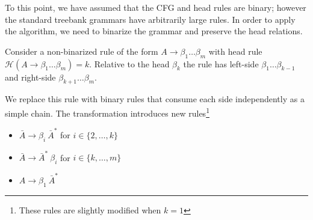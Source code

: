 \documentclass[11pt,letterpaper]{article}
\newcommand{\rules}{\mathcal{R}}
\newcommand{\Rule}[3]{#1 \rightarrow #2\ #3}
\newcommand{\RuleA}[3]{#1 \rightarrow #2^*\ #3}
\newcommand{\lpkcomment}[1]{\textcolor{red}{\bf \small [#1 --lpk]}}
\begin{document}
To this point, we have assumed that the CFG and head rules are binary;
however the standard treebank grammars have arbitrarily large rules.
In order to apply the algorithm, we need to binarize the grammar and
 preserve the head relations.  

 Consider a non-binarized rule of the form $ A \rightarrow \beta_1
 \ldots \beta_m$ with head rule $\mathcal{H}(A \rightarrow \beta_1
 \ldots \beta_m) = k$. Relative to the head $\beta_k$ the rule has
 left-side $\beta_1 \ldots \beta_{k-1}$ and right-side $\beta_{k+1}
 \ldots \beta_m$.




We replace this rule with binary rules that consume each side
independently as a simple chain.
The transformation introduces new rules\footnote{These rules are slightly modified when $k=1$}

\begin{itemize}
\item
$\Rule{\bar{A}} {\beta_i}{\bar{A}^{*}} $ for $i \in \{2, \ldots, k\}$

\item
$\Rule{\bar{A}}{\bar{A}^{*}}{\beta_i}$ for $i \in \{k, \ldots, m\}$

\item
$\Rule{A}{\beta_1}{\bar{A}^{*}}$ 

\end{itemize}


\end{document}
